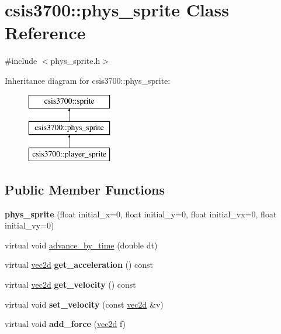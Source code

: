 \hypertarget{classcsis3700_1_1phys__sprite}{\section{csis3700\-:\-:phys\-\_\-sprite Class Reference}
\label{classcsis3700_1_1phys__sprite}
}


{\ttfamily \#include $<$phys\-\_\-sprite.\-h$>$}

Inheritance diagram for csis3700\-:\-:phys\-\_\-sprite\-:\begin{figure}[H]
\begin{center}
\leavevmode
\includegraphics[height=3.000000cm]{classcsis3700_1_1phys__sprite}
\end{center}
\end{figure}
\subsection*{Public Member Functions}
\begin{DoxyCompactItemize}
\item 
\hypertarget{classcsis3700_1_1phys__sprite_a300b8fcf6d18176c9dced92cd90edd99}{{\bfseries phys\-\_\-sprite} (float initial\-\_\-x=0, float initial\-\_\-y=0, float initial\-\_\-vx=0, float initial\-\_\-vy=0)}\label{classcsis3700_1_1phys__sprite_a300b8fcf6d18176c9dced92cd90edd99}

\item 
virtual void \hyperlink{classcsis3700_1_1phys__sprite_a3bb24599b1bc2fd13846826308914db4}{advance\-\_\-by\-\_\-time} (double dt)
\item 
\hypertarget{classcsis3700_1_1phys__sprite_af69d2201b23b3ebc3e81757f473285a1}{virtual \hyperlink{classcsis3700_1_1vec2d}{vec2d} {\bfseries get\-\_\-acceleration} () const }\label{classcsis3700_1_1phys__sprite_af69d2201b23b3ebc3e81757f473285a1}

\item 
\hypertarget{classcsis3700_1_1phys__sprite_a72682ff328159518f110a935ff8670dd}{virtual \hyperlink{classcsis3700_1_1vec2d}{vec2d} {\bfseries get\-\_\-velocity} () const }\label{classcsis3700_1_1phys__sprite_a72682ff328159518f110a935ff8670dd}

\item 
\hypertarget{classcsis3700_1_1phys__sprite_a2dd7b26fd33125f84f3eccabac146dcd}{virtual void {\bfseries set\-\_\-velocity} (const \hyperlink{classcsis3700_1_1vec2d}{vec2d} \&v)}\label{classcsis3700_1_1phys__sprite_a2dd7b26fd33125f84f3eccabac146dcd}

\item 
\hypertarget{classcsis3700_1_1phys__sprite_ade2d0f1d3e03981d89a8549ec3a1999c}{virtual void {\bfseries add\-\_\-force} (\hyperlink{classcsis3700_1_1vec2d}{vec2d} f)}\label{classcsis3700_1_1phys__sprite_ade2d0f1d3e03981d89a8549ec3a1999c}

\end{DoxyCompactItemize}

